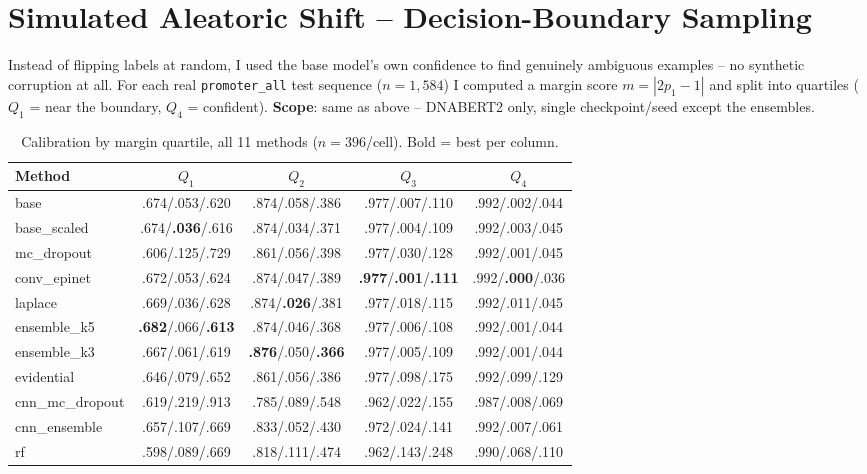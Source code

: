 \section{Simulated Aleatoric Shift -- Decision-Boundary Sampling}
\label{sec:aleatoric-shift-boundary}

Instead of flipping labels at random, I used the base model's own confidence
to find genuinely ambiguous examples -- no synthetic corruption at all. For
each real \texttt{promoter\_all} test sequence ($n{=}1{,}584$) I computed a
margin score $m=|2p_1-1|$ and split into quartiles ($Q_1$ = near the
boundary, $Q_4$ = confident). \textbf{Scope}: same as above -- DNABERT2
only, single checkpoint/seed except the ensembles.

\begin{table}[t]
\centering
\caption{Calibration by margin quartile, all 11 methods ($n{=}396$/cell).
Bold = best per column.}
\label{tab:boundary-calibration}
\begin{tabular}{lcccc}
\toprule
Method & $Q_1$ & $Q_2$ & $Q_3$ & $Q_4$ \\
\midrule
base             & .674/.053/.620 & .874/.058/.386 & .977/.007/.110 & .992/.002/.044 \\
base\_scaled     & .674/\textbf{.036}/.616 & .874/.034/.371 & .977/.004/.109 & .992/.003/.045 \\
mc\_dropout      & .606/.125/.729 & .861/.056/.398 & .977/.030/.128 & .992/.001/.045 \\
conv\_epinet     & .672/.053/.624 & .874/.047/.389 & \textbf{.977}/\textbf{.001}/\textbf{.111} & .992/\textbf{.000}/.036 \\
laplace          & .669/.036/.628 & .874/\textbf{.026}/.381 & .977/.018/.115 & .992/.011/.045 \\
ensemble\_k5     & \textbf{.682}/.066/\textbf{.613} & .874/.046/.368 & .977/.006/.108 & .992/.001/.044 \\
ensemble\_k3     & .667/.061/.619 & \textbf{.876}/.050/\textbf{.366} & .977/.005/.109 & .992/.001/.044 \\
evidential       & .646/.079/.652 & .861/.056/.386 & .977/.098/.175 & .992/.099/.129 \\
cnn\_mc\_dropout & .619/.219/.913 & .785/.089/.548 & .962/.022/.155 & .987/.008/.069 \\
cnn\_ensemble    & .657/.107/.669 & .833/.052/.430 & .972/.024/.141 & .992/.007/.061 \\
rf               & .598/.089/.669 & .818/.111/.474 & .962/.143/.248 & .990/.068/.110 \\
\bottomrule
\end{tabular}
\end{table}

